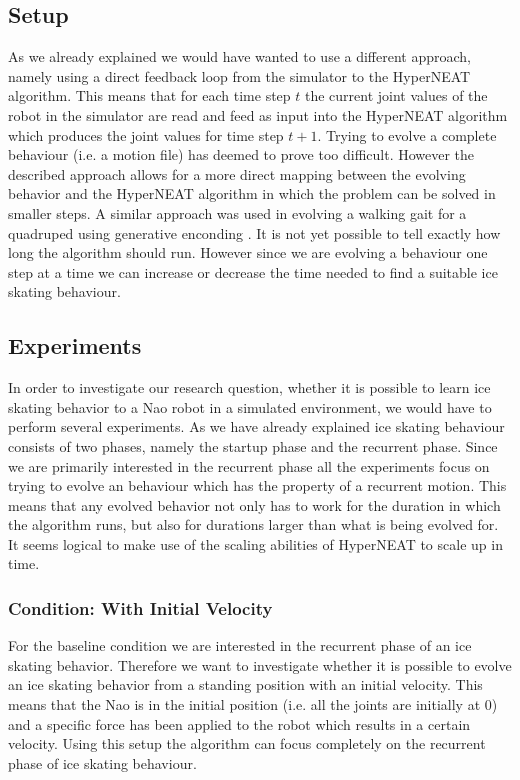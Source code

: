 \documentclass[a4paper,10pt]{article}
\begin{document}
\subsection{Setup}
\label{sec:setup}
As we already explained we would have wanted to use a different approach, namely using a direct feedback loop from the simulator to the HyperNEAT algorithm. This means that for each time step $t$ the current joint values of the robot in the simulator are read and feed as input into the HyperNEAT algorithm which produces the joint values for time step $t + 1$. Trying to evolve a complete behaviour (i.e. a motion file) has deemed to prove too difficult. However the described approach allows for a more direct mapping between the evolving behavior and the HyperNEAT algorithm in which the problem can be solved in smaller steps. A similar approach was used in evolving a walking gait for a quadruped using generative enconding \cite{EvolvingCoordinatedQuadrupedQaitsWithTheHyperNEATGenerativeEncoding}. It is not yet possible to tell exactly how long the algorithm should run. However since we are evolving a behaviour one step at a time we can increase or decrease the time needed to find a suitable ice skating behaviour.

\subsection{Experiments}
In order to investigate our research question, whether it is possible to learn ice skating behavior to a Nao robot in a simulated environment, we would have to perform several experiments. As we have already explained ice skating behaviour consists of two phases, namely the startup phase and the recurrent phase. Since we are primarily interested in the recurrent phase all the experiments focus on trying to evolve an behaviour which has the property of a recurrent motion. This means that any evolved behavior not only has to work for the duration in which the algorithm runs, but also for durations larger than what is being evolved for. It seems logical to make use of the scaling abilities of HyperNEAT to scale up in time. 

\subsubsection{Condition: With Initial Velocity}
For the baseline condition we are interested in the recurrent phase of an ice skating behavior. Therefore we want to investigate whether it is possible to evolve an ice skating behavior from a standing position with an initial velocity. This means that the Nao is in the initial position (i.e. all the joints are initially at 0) and a specific force has been applied to the robot which results in a certain velocity. Using this setup the algorithm can focus completely on the recurrent phase of ice skating behaviour.
\end{document}
